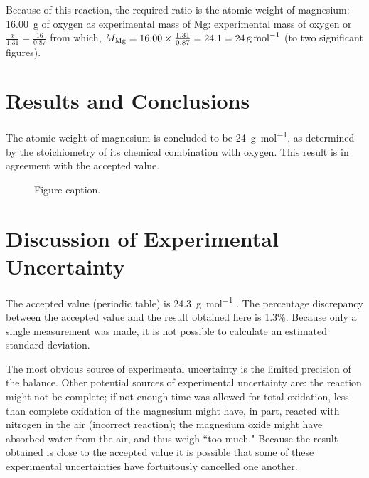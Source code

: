\documentclass{article}
\begin{document}
Because of this reaction, the required ratio is the atomic weight of magnesium: \SI{16.00}{\gram} of oxygen as experimental mass of Mg: experimental mass of oxygen or $\frac{x}{1.31}=\frac{16}{0.87}$ from which, $M_{\ce{Mg}} = 16.00 \times \frac{1.31}{0.87} = 24.1 = \SI{24}{\gram\per\mole}$ (to two significant figures).


\section{Results and Conclusions}

The atomic weight of magnesium is concluded to be \SI{24}{\gram\per\mol}, as determined by the stoichiometry of its chemical combination with oxygen. This result is in agreement with the accepted value.

\begin{figure}[h]
\begin{center}

\caption{Figure caption.}
\end{center}
\end{figure}


\section{Discussion of Experimental Uncertainty}

The accepted value (periodic table) is \SI{24.3}{\gram\per\mole} \cite{Smith:2012qr}. The percentage discrepancy between the accepted value and the result obtained here is 1.3\%. Because only a single measurement was made, it is not possible to calculate an estimated standard deviation.

The most obvious source of experimental uncertainty is the limited precision of the balance. Other potential sources of experimental uncertainty are: the reaction might not be complete; if not enough time was allowed for total oxidation, less than complete oxidation of the magnesium might have, in part, reacted with nitrogen in the air (incorrect reaction); the magnesium oxide might have absorbed water from the air, and thus weigh ``too much." Because the result obtained is close to the accepted value it is possible that some of these experimental uncertainties have fortuitously cancelled one another.
\end{document}
